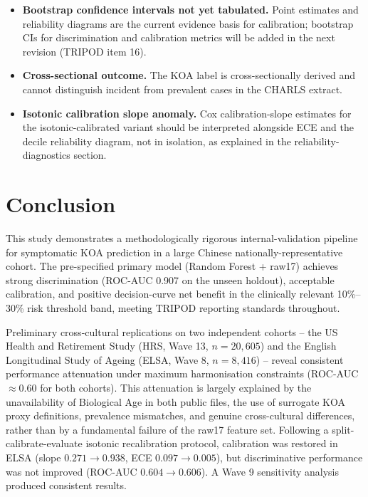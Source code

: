 \documentclass[11pt,a4paper]{article}
\begin{document}
\begin{itemize}
\item \textbf{Bootstrap confidence intervals not yet tabulated.} Point estimates and reliability
diagrams are the current evidence basis for calibration; bootstrap CIs for discrimination and
calibration metrics will be added in the next revision (TRIPOD item 16).

\item \textbf{Cross-sectional outcome.} The KOA label is cross-sectionally derived and cannot
distinguish incident from prevalent cases in the CHARLS extract.

\item \textbf{Isotonic calibration slope anomaly.} Cox calibration-slope estimates for the
isotonic-calibrated variant should be interpreted alongside ECE and the decile reliability diagram,
not in isolation, as explained in the reliability-diagnostics section.

\end{itemize}

\section{Conclusion}
This study demonstrates a methodologically rigorous internal-validation pipeline for symptomatic KOA
prediction in a large Chinese nationally-representative cohort. The pre-specified primary model
(Random Forest + raw17) achieves strong discrimination (ROC-AUC 0.907 on the unseen holdout),
acceptable calibration, and positive decision-curve net benefit in the clinically relevant
10\%--30\% risk threshold band, meeting TRIPOD reporting standards throughout.

Preliminary cross-cultural replications on two independent cohorts -- the US Health and Retirement
Study (HRS, Wave 13, $n=20{,}605$) and the English Longitudinal Study of Ageing (ELSA, Wave 8,
$n=8{,}416$) -- reveal consistent performance attenuation under maximum harmonisation constraints
(ROC-AUC ${\approx}0.60$ for both cohorts). This attenuation is largely explained by the
unavailability of Biological Age in both public files, the use of surrogate KOA proxy definitions,
prevalence mismatches, and genuine cross-cultural differences, rather than by a fundamental
failure of the raw17 feature set. Following a split-calibrate-evaluate isotonic recalibration
protocol, calibration was restored in ELSA (slope $0.271 \rightarrow 0.938$, ECE $0.097
\rightarrow 0.005$), but discriminative performance was not improved (ROC-AUC $0.604
\rightarrow 0.606$). A Wave 9 sensitivity analysis produced consistent results.
\end{document}
